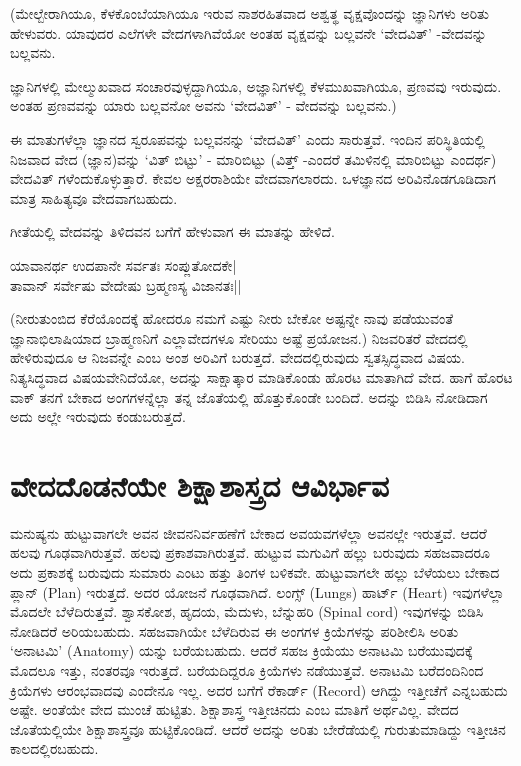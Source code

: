 (ಮೇಲ್ಬೇರಾಗಿಯೂ, ಕೆಳಕೊಂಬೆಯಾಗಿಯೂ ಇರುವ ನಾಶರಹಿತವಾದ ಅಶ್ವತ್ಥ  ವೃಕ್ಷವೊಂದನ್ನು ಜ್ಞಾನಿಗಳು ಅರಿತು ಹೇಳುವರು. ಯಾವುದರ ಎಲೆಗಳೇ ವೇದಗಳಾಗಿವೆಯೋ ಅಂತಹ ವೃಕ್ಷವನ್ನು ಬಲ್ಲವನೇ `ವೇದವಿತ್' -ವೇದವನ್ನು  ಬಲ್ಲವನು.

ಜ್ಞಾನಿಗಳಲ್ಲಿ ಮೇಲ್ಮುಖವಾದ ಸಂಚಾರವುಳ್ಳದ್ದಾಗಿಯೂ, ಅಜ್ಞಾನಿಗಳಲ್ಲಿ ಕೆಳಮುಖವಾಗಿಯೂ, ಪ್ರಣವವು ಇರುವುದು. ಅಂತಹ ಪ್ರಣವವನ್ನು ಯಾರು ಬಲ್ಲವನೋ ಅವನು `ವೇದವಿತ್' - ವೇದವನ್ನು ಬಲ್ಲವನು.)

ಈ ಮಾತುಗಳೆಲ್ಲಾ ಜ್ಞಾನದ ಸ್ವರೂಪವನ್ನು ಬಲ್ಲವನನ್ನು `ವೇದವಿತ್' ಎಂದು ಸಾರುತ್ತವೆ. ಇಂದಿನ ಪರಿಸ್ಥಿತಿಯಲ್ಲಿ ನಿಜವಾದ ವೇದ (ಜ್ಞಾನ)ವನ್ನು `ವಿತ್ ಬಿಟ್ಟು' - ಮಾರಿಬಿಟ್ಟು (ವಿತ್ತ್ -ಎಂದರೆ ತಮಿಳಿನಲ್ಲಿ ಮಾರಿಬಿಟ್ಟು ಎಂದರ್ಥ) ವೇದವಿತ್ ಗಳೆಂದುಕೊಳ್ಳುತ್ತಾರೆ. ಕೇವಲ ಅಕ್ಷರರಾಶಿಯೇ ವೇದವಾಗಲಾರದು. ಒಳಜ್ಞಾನದ ಅರಿವಿನೊಡಗೂಡಿದಾಗ ಮಾತ್ರ  ಸಾಹಿತ್ಯವೂ ವೇದವಾಗಬಹುದು.

ಗೀತೆಯಲ್ಲಿ ವೇದವನ್ನು ತಿಳಿದವನ ಬಗೆಗೆ ಹೇಳುವಾಗ ಈ ಮಾತನ್ನು ಹೇಳಿದೆ.
\begin{shloka}
ಯಾವಾನರ್ಥ ಉದಪಾನೇ ಸರ್ವತಃ ಸಂಪ್ಲುತೋದಕೇ|\label{14}\\
ತಾವಾನ್ ಸರ್ವೇಷು ವೇದೇಷು ಬ್ರಹ್ಮಣಸ್ಯ ವಿಜಾನತಃ||
\end{shloka}

(ನೀರುತುಂಬಿದ ಕೆರೆಯೊಂದಕ್ಕೆ  ಹೋದರೂ ನಮಗೆ ಎಷ್ಟು ನೀರು ಬೇಕೋ ಅಷ್ಟನ್ನೇ ನಾವು ಪಡೆಯುವಂತೆ ಜ್ಞಾನಾಭಿಲಾಷಿಯಾದ ಬ್ರಾಹ್ಮಣನಿಗೆ ಎಲ್ಲಾವೇದಗಳೂ ಸೇರಿಯು ಅಷ್ಟೆ ಪ್ರಯೋಜನ.) ನಿಜವರಿತರೆ ವೇದದಲ್ಲಿ ಹೇಳಿರುವುದೂ ಆ ನಿಜವನ್ನೇ ಎಂಬ ಅಂಶ ಅರಿವಿಗೆ ಬರುತ್ತದೆ. ವೇದದಲ್ಲಿರುವುದು ಸ್ವತಸ್ಸಿದ್ಧವಾದ ವಿಷಯ. ನಿತ್ಯಸಿದ್ಧವಾದ ವಿಷಯವೇನಿದೆಯೋ, ಅದನ್ನು ಸಾಕ್ಷಾತ್ಕಾರ ಮಾಡಿಕೊಂಡು ಹೊರಟ ಮಾತಾಗಿದೆ ವೇದ. ಹಾಗೆ ಹೊರಟ ವಾಕ್ ತನಗೆ ಬೇಕಾದ ಅಂಗಗಳನ್ನೆಲ್ಲಾ ತನ್ನ ಜೊತೆಯಲ್ಲಿ ಹೊತ್ತುಕೊಂಡೇ ಬಂದಿದೆ. ಅದನ್ನು ಬಿಡಿಸಿ ನೋಡಿದಾಗ ಅದು ಅಲ್ಲೇ ಇರುವುದು ಕಂಡುಬರುತ್ತದೆ.

\section*{ವೇದದೊಡನೆಯೇ ಶಿಕ್ಷಾಶಾಸ್ತ್ರದ ಆವಿರ್ಭಾವ}

ಮನುಷ್ಯನು ಹುಟ್ಟುವಾಗಲೇ ಅವನ ಜೀವನನಿರ್ವಹಣೆಗೆ ಬೇಕಾದ ಅವಯವಗಳೆಲ್ಲಾ ಅವನಲ್ಲೇ ಇರುತ್ತವೆ. ಆದರೆ ಹಲವು ಗೂಢವಾಗಿರುತ್ತವೆ. ಹಲವು ಪ್ರಕಾಶವಾಗಿರುತ್ತವೆ. ಹುಟ್ಟುವ ಮಗುವಿಗೆ ಹಲ್ಲು ಬರುವುದು ಸಹಜವಾದರೂ ಅದು ಪ್ರಕಾಶಕ್ಕೆ ಬರುವುದು ಸುಮಾರು ಎಂಟು ಹತ್ತು ತಿಂಗಳ ಬಳಿಕವೇ. ಹುಟ್ಟುವಾಗಲೇ ಹಲ್ಲು ಬೆಳೆಯಲು ಬೇಕಾದ ಪ್ಲಾನ್ {(\eng Plan)} ಇರುತ್ತದೆ. ಅದರ ಯೋಜನೆ ಗೂಢವಾಗಿದೆ. ಲಂಗ್ಸ್  {(\eng Lungs)} ಹಾರ್ಟ್ {(\eng Heart)} ಇವುಗಳೆಲ್ಲಾ ಮೊದಲೇ ಬೆಳೆದಿರುತ್ತವೆ. ಶ್ವಾಸಕೋಶ, ಹೃದಯ, ಮೆದುಳು, ಬೆನ್ನುಹರಿ {(\eng Spinal cord)} ಇವುಗಳನ್ನು  ಬಿಡಿಸಿ ನೋಡಿದರೆ ಅರಿಯಬಹುದು. ಸಹಜವಾಗಿಯೇ ಬೆಳೆದಿರುವ ಈ ಅಂಗಗಳ ಕ್ರಿಯೆಗಳನ್ನು ಪರಿಶೀಲಿಸಿ ಅರಿತು `ಅನಾಟಮಿ' {(\eng Anatomy)} ಯನ್ನು ಬರೆಯಬಹುದು. ಆದರೆ ಸಹಜ ಕ್ರಿಯೆಯು ಅನಾಟಮಿ ಬರೆಯುವುದಕ್ಕೆ  ಮೊದಲೂ ಇತ್ತು, ನಂತರವೂ ಇರುತ್ತದೆ. ಬರೆಯದಿದ್ದರೂ ಕ್ರಿಯೆಗಳು ನಡೆಯುತ್ತವೆ. ಅನಾಟಮಿ ಬರೆದಂದಿನಿಂದ ಕ್ರಿಯೆಗಳು ಆರಂಭವಾದವು ಎಂದೇನೂ ಇಲ್ಲ. ಅದರ ಬಗೆಗೆ ರೆಕಾರ್ಡ್ 
{\eng(Record)} ಆಗಿದ್ದು ಇತ್ತೀಚೆಗೆ ಎನ್ನಬಹುದು ಅಷ್ಟೇ. ಅಂತೆಯೇ ವೇದ ಮುಂಚೆ ಹುಟ್ಟಿತು. ಶಿಕ್ಷಾಶಾಸ್ತ್ರ ಇತ್ತೀಚಿನದು ಎಂಬ ಮಾತಿಗೆ ಅರ್ಥವಿಲ್ಲ. ವೇದದ ಜೊತೆಯಲ್ಲಿಯೇ ಶಿಕ್ಷಾಶಾಸ್ತ್ರವೂ ಹುಟ್ಟಿಕೊಂಡಿದೆ. ಆದರೆ ಅದನ್ನು ಅರಿತು ಬೇರೆಡೆಯಲ್ಲಿ ಗುರುತುಮಾಡಿದ್ದು ಇತ್ತೀಚಿನ ಕಾಲದಲ್ಲಿರಬಹುದು.

